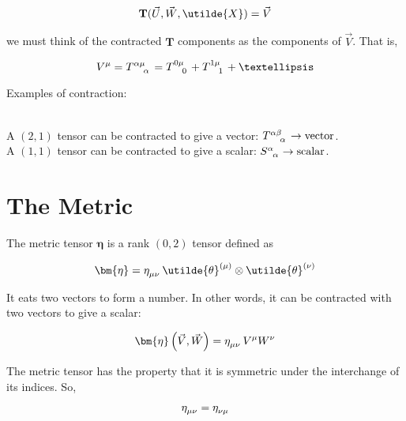 \documentclass[11pt]{article}
\newcommand\tikzmark[1]{\tikz[remember picture,overlay]\coordinate (#1);}
\begin{document}
\begin{equation}
\textbf{T}({\tikzmark{z1}\vec{U},\vec{W},\tikzmark{z2}\utilde{X}}) = \vec{V} 
\end{equation}


\noindent we must think of the contracted $\textbf{T}$ components as the components of $\vec{V}$. That is,

\begin{equation}\tensor{V}{^\mu}=\tensor{T}{^\alpha^\mu_\alpha}=\tensor{T}{^0^\mu_0}+\tensor{T}{^1^\mu_1}+\textellipsis
\end{equation}


\noindent Examples of contraction: 

\noindent \\A $(2,1)$ tensor can be contracted to give a vector: $\tensor{T}{^\alpha^\beta_\alpha}\rightarrow\text{vector}$.
\noindent \\A $(1,1)$ tensor can be contracted to give a scalar: $\tensor{S}{^\alpha_\alpha}\rightarrow\text{scalar}$.

\section{The Metric}

The metric tensor $\bm{\eta}$ is a rank $(0,2)$ tensor defined as

\begin{equation}
\bm{\eta}=\tensor{\eta}{_\mu_\nu}\, \utilde{\theta}^{\left(\mu\right)}\otimes \utilde{\theta}^{\left(\nu\right)}
\end{equation}

It eats two vectors to form a number. In other words, it can be contracted with two vectors to give a scalar:

\begin{equation}
\bm{\eta}\left(\vec{V},\vec{W}\right)=\tensor{\eta}{_\mu_\nu}\, V^\mu W^\nu
\end{equation}

The metric tensor has the property that it is symmetric under the interchange of its indices. So, 

\begin{equation}
\tensor{\eta}{_\mu_\nu}=\tensor{\eta}{_\nu_\mu}
\end{equation}
\end{document}
